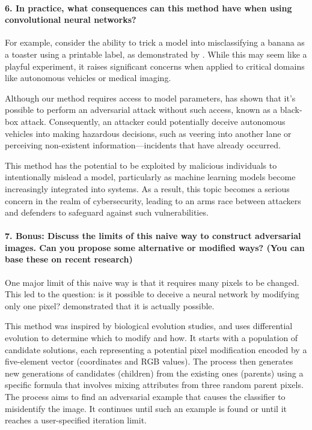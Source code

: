 
\paragraph*{6. In practice, what consequences can this method have when using convolutional neural networks?}

For example, consider the ability to trick a model into misclassifying a banana as a toaster using a printable label, as demonstrated by \cite{brown2018adversarial}. While this may seem like a playful experiment, it raises significant concerns when applied to critical domains like autonomous vehicles or medical imaging. 

Although our method requires access to model parameters, \cite{athalye2018synthesizing} has shown that it's possible to perform an adversarial attack without such access, known as a black-box attack. Consequently, an attacker could potentially deceive autonomous vehicles into making hazardous decisions, such as veering into another lane or perceiving non-existent information—incidents that have already occurred. 

This method has the potential to be exploited by malicious individuals to intentionally mislead a model, particularly as machine learning models become increasingly integrated into systems. As a result, this topic becomes a serious concern in the realm of cybersecurity, leading to an arms race between attackers and defenders to safeguard against such vulnerabilities.

\paragraph*{7. \textbf{Bonus:} Discuss the limits of this naive way to construct adversarial images. Can you propose some alternative or modiﬁed ways? (You can base these on recent research)}

One major limit of this naive way is that it requires many pixels to be changed. This led to the question: is it possible to deceive a neural network by modifying only one pixel? \cite{Su_2019} demonstrated that it is actually possible.

This method was inspired by biological evolution studies, and uses differential evolution to determine which to modify and how. It starts with a population of candidate solutions, each representing a potential pixel modification encoded by a five-element vector (coordinates and RGB values). The process then generates new generations of candidates (children) from the existing ones (parents) using a specific formula that involves mixing attributes from three random parent pixels. The process aims to find an adversarial example that causes the classifier to misidentify the image. It continues until such an example is found or until it reaches a user-specified iteration limit.

